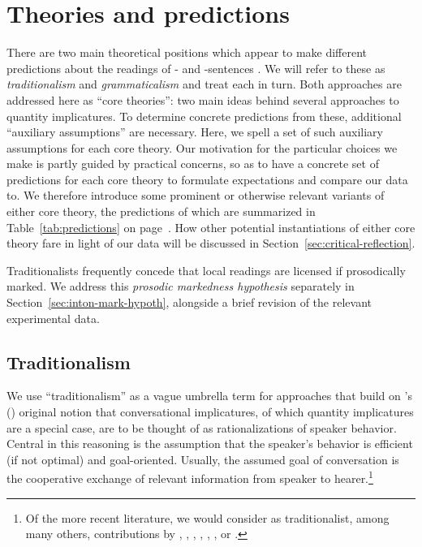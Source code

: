 \documentclass[fleqn,reqno,10pt]{article}
\newcommand{\as}{\acro{as}}
\renewcommand{\es}{\acro{es}}
\begin{document}
\section{Theories and predictions}
\label{sec:theories-predictions}

There are two main theoretical positions which appear to make
different predictions about the readings of \as- and \es-sentences
\citep[see][for
overview]{Horn2006:The-Border-Wars,Geurts2010:Quantity-Implic,Sauerland2012:The-Computation,ChemlaSingh2014:Remarks-on-the-}. We
will refer to these as \emph{traditionalism} and \emph{grammaticalism}
and treat each in turn. Both approaches are addressed here as ``core
theories'': two main ideas behind several approaches to quantity
implicatures. To determine concrete predictions from these, additional
``auxiliary assumptions'' are necessary. Here, we spell a set of such
auxiliary assumptions for each core theory. Our motivation for the
particular choices we make is partly guided by practical concerns, so
as to have a concrete set of predictions for each core theory to
formulate expectations and compare our data to. We therefore introduce
some prominent or otherwise relevant variants of either core theory,
the predictions of which are summarized in Table~\ref{tab:predictions}
on page~\pageref{tab:predictions}. How other potential instantiations
of either core theory fare in light of our data will be discussed in
Section~\ref{sec:critical-reflection}.

Traditionalists frequently concede that local readings are licensed if
prosodically marked. We address this \emph{prosodic markedness
  hypothesis} separately in Section~\ref{sec:inton-mark-hypoth},
alongside a brief revision of the relevant experimental data.

\subsection{Traditionalism}
\label{sec:traditionalism}

We use ``traditionalism'' as a vague umbrella term for approaches that
build on \citeauthor{Grice1975:Logic-and-Conve}'s
(\citeyear{Grice1975:Logic-and-Conve}) original notion that
conversational implicatures, of which quantity implicatures are a
special case, are to be thought of as rationalizations of speaker
behavior. Central in this reasoning is the assumption that the
speaker's behavior is efficient (if not optimal) and
goal-oriented. Usually, the assumed goal of conversation is the
cooperative exchange of relevant information from speaker to
hearer.\footnote{Of the more recent literature, we would consider as
  traditionalist, among many others, contributions by
  \citet{Spector2006:Scalar-Implicat},
  \citet{Sauerland2004:Scalar-Implicat},
  \citet{Russell2006:Against-Grammat},
  \citet{vanRooijSchulz:ExhaustiveInterpretation},
  \citet{Geurts2010:Quantity-Implic},
  \citet{Franke2011:Quantity-Implic}, or
  \citet{GoodmanStuhlmuller2013:Knowledge-and-I}.}
\end{document}
